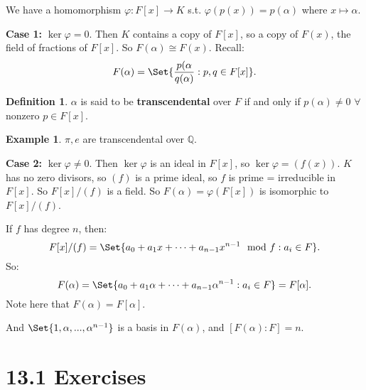 \documentclass[9pt,reqno,twoside]{amsbook}
\theoremstyle{plain}
\numberwithin{section}{chapter}
\numberwithin{equation}{chapter}
\theoremstyle{definition}
\newtheorem{Def}[theorem]{Definition}
\newtheorem{Ex}[theorem]{Example}
\theoremstyle{remark}
\theoremstyle{plain}
\newcommand{\Q}{\mathbb{Q}}
\newcommand{\fracc}{\frac}
\renewcommand{\phi}{\varphi}
\begin{document}
We have a homomorphism $\phi:F[x] \to K$ s.t. $\phi(p(x)) = p(\alpha)$ where $x \mapsto \alpha$. 

\textbf{Case 1: }$\ker\phi = 0$. Then $K$ contains a copy of $F[x]$, so a copy of $F(x)$, the field of fractions of $F[x]$. So $F(\alpha) \cong F(x)$. Recall:
$$
F(\alpha)  = \Set{\fracc{p(\alpha}{q(\alpha)}:p,q \in F[x]}.
$$

\begin{Def}
$\alpha$ is said to be \textbf{transcendental} over $F$ if and only if $p(\alpha) \neq 0$ $\forall$ nonzero $p \in F[x]$. 
\end{Def}

\begin{Ex}
$\pi,e$ are transcendental over $\Q$. 
\end{Ex}


\textbf{Case 2: }$\ker\phi \neq 0$. Then $\ker\phi$ is an ideal in $F[x]$, so $\ker\phi = (f(x))$. $K$ has no zero divisors, so $(f)$ is a prime ideal, so $f$ is prime = irreducible in $F[x]$. So $F[x]/(f)$ is a field. So $F(\alpha) = \phi(F[x])$ is isomorphic to $F[x]/(f)$. 


If $f$ has degree $n$, then:
$$
F[x]/(f) = \Set{a_0 + a_1x + \cdots + a_{n - 1}x^{n - 1} \mod f:a_i \in F}.
$$
So:
$$
F(\alpha) = \Set{a_0 + a_1\alpha + \cdots + a_{n - 1}\alpha^{n - 1}:a_i \in F} = F[\alpha].
$$
Note here that $F(\alpha) = F[\alpha]$. 

And $\Set{1,\alpha,...,\alpha^{n - 1}}$ is a basis in $F(\alpha)$, and $[F(\alpha):F] = n$. 


\section*{13.1 Exercises}
\end{document}
